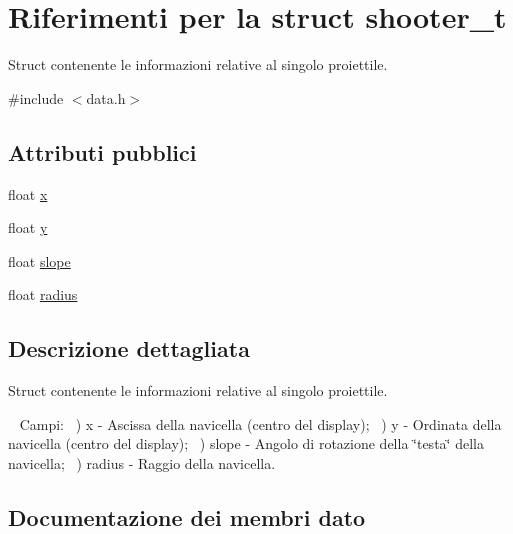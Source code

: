 \hypertarget{structshooter__t}{}\section{Riferimenti per la struct shooter\+\_\+t}
\label{structshooter__t}


Struct contenente le informazioni relative al singolo proiettile.  




{\ttfamily \#include $<$data.\+h$>$}

\subsection*{Attributi pubblici}
\begin{DoxyCompactItemize}
\item 
float \hyperlink{structshooter__t_aede1685d00f485e9f0ed40279f3d147e}{x}
\item 
float \hyperlink{structshooter__t_adb6e42adc6b761f77c23208379a77711}{y}
\item 
float \hyperlink{structshooter__t_a958ea335a4ec8e592edb6ba8c927d511}{slope}
\item 
float \hyperlink{structshooter__t_a9e2043ccd69d180eca3f1b2b2b0fcaff}{radius}
\end{DoxyCompactItemize}


\subsection{Descrizione dettagliata}
Struct contenente le informazioni relative al singolo proiettile. 

~\newline
Campi\+: ~) x -\/ Ascissa della navicella (centro del display); ~) y -\/ Ordinata della navicella (centro del display); ~) slope -\/ Angolo di rotazione della \char`\"{}testa\char`\"{} della navicella; ~) radius -\/ Raggio della navicella. 

\subsection{Documentazione dei membri dato}
\mbox{\label{structshooter__t_a9e2043ccd69d180eca3f1b2b2b0fcaff}} 
